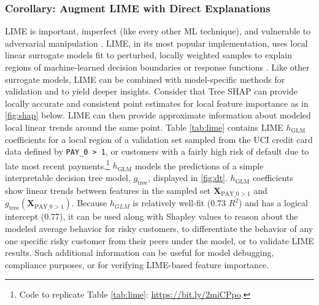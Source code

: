 \documentclass{article}
\begin{document}
\subsubsection{Corollary: Augment LIME with Direct Explanations} LIME is important, imperfect (like every other ML technique), and vulnerable to adversarial manipulation \cite{scaffolding}. LIME, in its most popular implementation, uses local linear surrogate models fit to perturbed, locally weighted samples to explain regions of machine-learned decision boundaries or response functions \cite{lime}. Like other surrogate models, LIME can be combined with model-specific methods for validation and to yield deeper insights. Consider that Tree SHAP can provide locally accurate and consistent point estimates for local feature importance as in \ref{fig:shap} below. LIME can then provide approximate information about modeled local linear trends around the same point. Table \ref{tab:lime} contains LIME $h_{\text{GLM}}$ coefficients for a local region of a validation set sampled from the UCI credit card data defined by \texttt{PAY\_0 > 1}, or customers with a fairly high risk of default due to late most recent payments.\footnote{\scriptsize{Code to replicate Table \ref{tab:lime}: \url{https://bit.ly/2miCPpo}.}} $h_{\text{GLM}}$ models the predictions of a simple interpretable decision tree model, $g_{\text{tree}}$, displayed in \ref{fig:dt}. $h_{\text{GLM}}$ coefficients show linear trends between features in the sampled set $\mathbf{X}_{\text{PAY\_0} > 1}$ and $g_{\text{tree}}(\mathbf{X}_{\text{PAY\_0}> 1})$. Because $h_{GLM}$ is relatively well-fit (0.73 $R^2$) and has a logical intercept (0.77), it can be used along with Shapley values to reason about the modeled average behavior for risky customers, to differentiate the behavior of any one specific risky customer from their peers under the model, or to validate LIME results. Such additional information can be useful for model debugging, compliance purposes, or for verifying LIME-based feature importance. 
\end{document}
